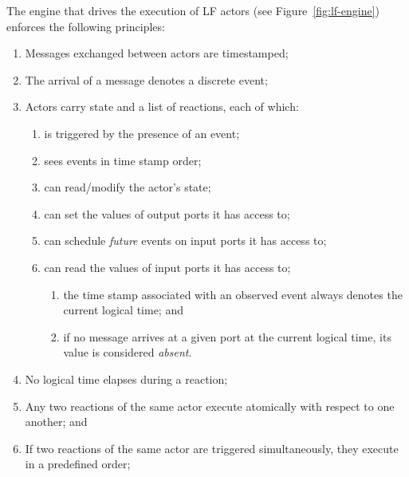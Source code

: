 \documentclass[sigconf]{acmart}
\begin{document}



The engine that drives the execution of LF actors (see Figure~\ref{fig:lf-engine}) enforces the following principles:

\begin{enumerate}
\item Messages exchanged between actors are timestamped;
\item The arrival of a message denotes a discrete event;
\item Actors carry state and a list of reactions, each of which:
\begin{enumerate}
\item is triggered by the presence of an event;
\item sees events in time stamp order;
\item can read/modify the actor's state;
\item can set the values of output ports it has access to;
\item can schedule \emph{future} events on input ports it has access to;
\item can read the values of input ports it has access to;
\begin{enumerate}
\item the time stamp associated with an observed event always denotes the current logical time; and
\item if no message arrives at a given port at the current logical time, its value is considered \emph{absent}.
\end{enumerate}
\end{enumerate}
\item No logical time elapses during a reaction;
\item Any two reactions of the same actor execute atomically with respect to one another; and
\item If two reactions of the same actor are triggered simultaneously, they execute in a predefined order;
\end{enumerate}
\end{document}
